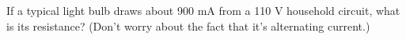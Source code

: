 If a typical light bulb draws about 900 mA from a 110 V
        household circuit, what is its resistance?  (Don't worry
        about the fact that it's alternating current.)
        \answercheck
